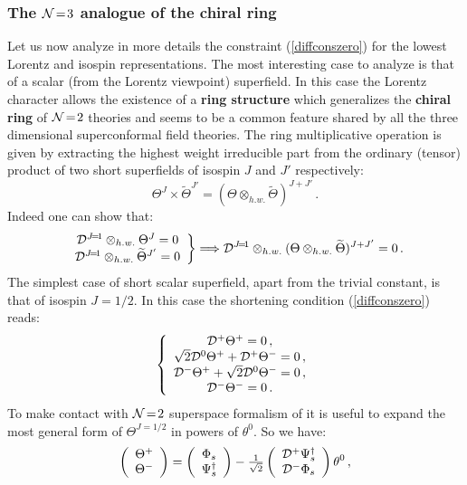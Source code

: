 \documentclass[a4paper,12pt]{article}
\newcommand{\ft}[2]{{\textstyle\frac{#1}{#2}}}
\def\tilde{\widetilde}
\begin{document}
\subsubsection{The ${\cal N}\!=\!3$ analogue of the chiral ring}
Let us now analyze in more details the constraint
(\ref{diffconszero}) for the lowest
Lorentz and isospin representations.
The most interesting case to analyze is that of a scalar (from
the Lorentz viewpoint) superfield.
In this case the Lorentz character allows the existence of a
{\bf ring structure} which generalizes the {\bf chiral ring} of
${\cal N}\!=\!2$ theories and seems to be a common feature shared
by all the three dimensional superconformal field theories.
The ring multiplicative operation is given by extracting  the
highest weight irreducible part from the ordinary (tensor) product
of two short superfields of isospin $J$ and $J'$ respectively:
\begin{equation}
\Theta^J\times\tilde\Theta^{J'}=\left(\Theta\otimes_{h.w.}
\tilde\Theta\right)^{J+J'}\,.
\end{equation}
Indeed one can show that:
\begin{equation}
\left.\begin{array}{c}
{\cal D}^{J\!=\!1}\otimes_{h.w.}\Theta^J=0\\
{\cal D}^{J\!=\!1}\otimes_{h.w.}\tilde\Theta^{J'}=0
\end{array}\right\}\Longrightarrow
{\cal D}^{J\!=\!1}\otimes_{h.w.}(\Theta\otimes_{h.w.}\tilde\Theta)
^{J+J'}=0\,.
\end{equation}
The simplest case of short scalar superfield, apart from the trivial
constant, is that of isospin $J\!=\!1/2$.
In this case  the shortening condition (\ref{diffconszero}) reads:
\begin{equation}
\left\{\begin{array}{c}
{\cal D}^+\Theta^+=0\,,\\
\sqrt{2}{\cal D}^0\Theta^++{\cal D}^+\Theta^-=0\,,\\
{\cal D}^-\Theta^++\sqrt{2}{\cal D}^0\Theta^-=0\,,\\
{\cal D}^-\Theta^-=0\,.
\end{array}\right.
\end{equation}
To make contact with ${\cal N}\!=\!2$ superspace formalism of
\cite{susp} it is useful to expand the most general form of
$\Theta^{J\!=\!1/2}$ in powers of $\theta^0$.
So we have:
\begin{equation}
\left(\begin{array}{c}
\Theta^+\\
\Theta^-
\end{array}\right)=\left(\begin{array}{c}
\Phi_s\\
\Psi_s^\dagger\end{array}\right)
-\ft{1}{\sqrt 2}
\left(\begin{array}{c}
{\cal D}^+\Psi_s^\dagger\\
{\cal D}^-\Phi_s
\end{array}\right)
\theta^0
\,,\label{J=1/2chiral}
\end{equation}
\end{document}
